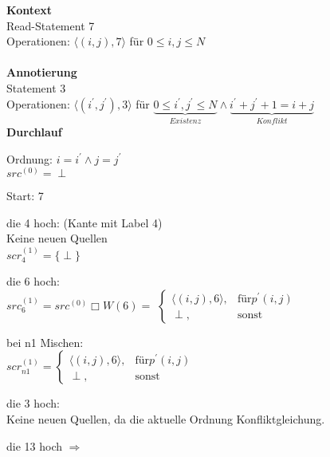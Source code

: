 \textbf{Kontext}\\
Read-Statement 7\\
Operationen: $\langle (i,j), 7 \rangle$ für $0 \leq i, j \leq N$\\
\\
\textbf{Annotierung}\\
Statement 3\\
Operationen: \(\langle (i^\prime,j^\prime), 3 \rangle\) für \( \underbrace{0 \leq i^\prime, j^\prime \leq N}_{Existenz} \land \underbrace{i^\prime + j^\prime + 1 = i + j}_{Konflikt}\)
\\
\textbf{Durchlauf}\\
\begin{\itemize}
    \item {Ordnung: \(i=i^\prime \land j=j^\prime\) \\
        \(src^{(0)} = {\perp}\)\\
        \begin{\itemize}
            \item Start: 7
            \item die 4 hoch: (Kante mit Label 4)\\
                  Keine neuen Quellen\\
                  \(scr_{4}^{(1)} = \lbrace \perp \rbrace\)
            \item die 6 hoch: \\
                  \(src_{6}^{(1)} = src^{(0)} \Box W(6) = \) 
    \(\begin{cases}  \langle (i,j), 6 \rangle , & \mbox{für} p^\prime(i,j) \\
                     \perp ,                    & \mbox{sonst}
    \end{cases}  \)

            \item bei n1 Mischen:\\
                \(scr_{n1}^{(1)} = 
    \begin{cases} \langle (i,j),6 \rangle, & \mbox{für} p^\prime(i,j) \\
                  \perp,                   & \mbox{sonst} 
                \end{cases} \)

            \item die 3 hoch:\\
                  Keine neuen Quellen, da die aktuelle Ordnung \blitza Konfliktgleichung.
            \item die 13 hoch \(\Rightarrow\)


\end{\itemize}}
\end{\itemize}
